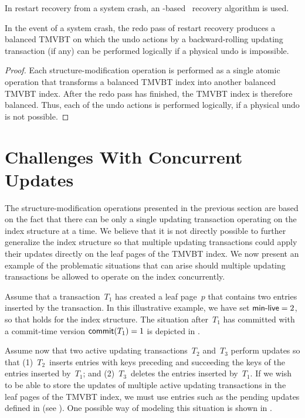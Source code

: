 In restart recovery from a system crash, an
-based~\cite{mohan:1992:aries,mohan:1990:aries-kvl} recovery
algorithm is used.

\thmskip
\begin{theorem}
\label{thm:tmvbt-recovery}
In the event of a system crash, the redo pass of restart recovery produces a
balanced TMVBT on which the undo actions by a backward-rolling updating
transaction (if any) can be performed logically if a physical undo is
impossible.
\end{theorem} 
\begin{proof}
Each structure-modification operation is performed as a single atomic
operation that transforms a balanced TMVBT index into another balanced TMVBT
index. 
After the redo pass has finished, the TMVBT index is therefore balanced.
Thus, each of the undo actions is performed logically, if a physical undo is
not possible.
\end{proof}
\thmskip



\section{Challenges With Concurrent Updates}
\label{sec:tmvbt:multiupdate}

The structure-modification operations presented in the previous section
are based on the fact that there can be only a single updating transaction
operating on the index structure at a time.
We believe that it is not directly possible to further generalize the index
structure so that multiple updating transactions could apply their updates
directly on the leaf pages of the TMVBT index.
We now present an example of the problematic situations that can arise should
multiple updating transactions be allowed to operate on the index
concurrently.

Assume that a transaction~$T_1$ has created a leaf page~$p$ that contains two
entries inserted by the transaction. 
In this illustrative example, we have set $\text{\textsf{min-live}} = 2$, so that
 holds for the index structure. 
The situation after~$T_1$ has committed with a commit-time version
$\text{\textsf{commit}}(T_1) = 1$ is depicted in .

Assume now that two active updating transactions~$T_2$ and~$T_3$ perform
updates so that (1)~$T_2$~inserts entries with keys preceding and succeeding
the keys of the entries inserted by~$T_1$; and 
(2)~$T_3$~deletes the entries inserted by~$T_1$.
If we wish to be able to store the updates of multiple active updating
transactions in the leaf pages of the TMVBT index, we must use entries such as
the pending updates defined in  (see
). 
One possible way of modeling this situation is shown in
.

